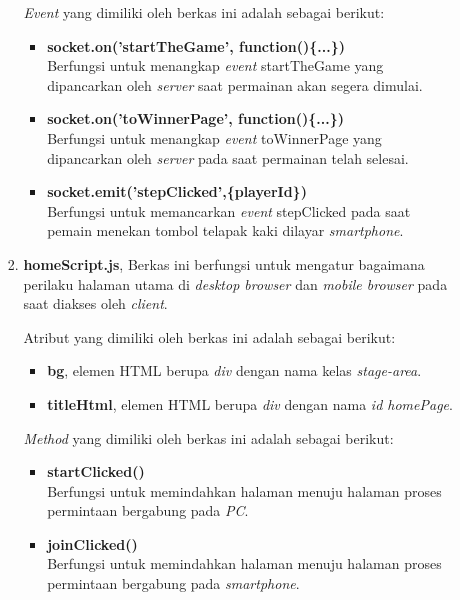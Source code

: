 \begin{enumerate}
\begin{enumerate}
\begin{enumerate}
			\textit{Event} yang dimiliki oleh berkas ini adalah sebagai berikut:
			\begin{itemize}
				\item \textbf{socket.on('startTheGame', function()\{...\})}\\
				Berfungsi untuk menangkap \textit{event} startTheGame yang dipancarkan oleh \textit{server} saat permainan akan segera dimulai.
				
				\item \textbf{socket.on('toWinnerPage', function()\{...\})}\\
				Berfungsi untuk menangkap \textit{event} toWinnerPage yang dipancarkan oleh \textit{server} pada saat permainan telah selesai.
				
				\item \textbf{socket.emit('stepClicked',\{playerId\})} \\
				Berfungsi untuk memancarkan \textit{event} stepClicked pada saat pemain menekan tombol telapak kaki dilayar \textit{smartphone}.
			\end{itemize}
			
			\item \textbf{homeScript.js}, Berkas ini berfungsi untuk mengatur bagaimana perilaku halaman utama di \textit{desktop browser} dan \textit{mobile browser} pada saat diakses oleh \textit{client}.
			
			Atribut yang dimiliki oleh berkas ini adalah sebagai berikut:
			\begin{itemize}
				\item \textbf{bg}, elemen HTML berupa \textit{div} dengan nama kelas \textit{stage-area}.
				\item \textbf{titleHtml}, elemen HTML berupa \textit{div} dengan nama \textit{id homePage}.
			\end{itemize}
			
			\textit{Method} yang dimiliki oleh berkas ini adalah sebagai berikut:
			\begin{itemize}
				\item \textbf{startClicked()} \\
				Berfungsi untuk memindahkan halaman menuju halaman proses permintaan bergabung pada \textit{PC}.
				
				\item \textbf{joinClicked()} \\
				Berfungsi untuk memindahkan halaman menuju halaman proses permintaan bergabung pada \textit{smartphone}.
			\end{itemize}
			

\end{enumerate}
\end{enumerate}
\end{enumerate}
